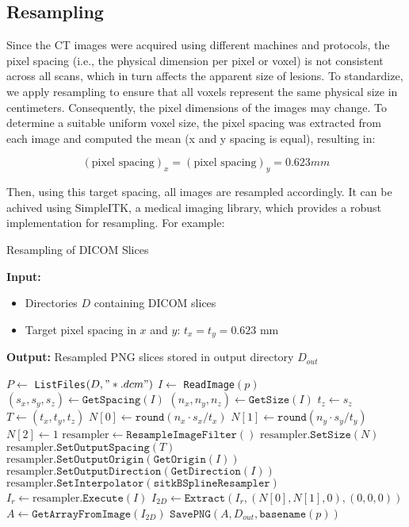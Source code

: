 \subsection*{Resampling}
Since the CT images were acquired using different machines and protocols, the pixel spacing (i.e., the physical dimension per pixel or voxel) is not consistent across all scans, which in turn affects the apparent size of lesions. To standardize, we apply resampling to ensure that all voxels represent the same physical size in centimeters. Consequently, the pixel dimensions of the images may change.
To determine a suitable uniform voxel size, the pixel spacing  was extracted from each image and computed the mean (x and y spacing is equal), resulting in: 

\begin{equation*}
    (\text{pixel spacing})_x = (\text{pixel spacing})_y = 0.623 mm
\end{equation*}

Then, using this target spacing, all images are resampled accordingly.
It can be achived using SimpleITK, a medical imaging library, which provides a robust implementation for resampling. For example:

\begin{algorithm}[H]
    \caption{Resampling of DICOM Slices}
    \begin{algorithmic}[1]
    \State \textbf{Input:} 
    \begin{itemize}
        \item Directories $D$ containing DICOM slices
        \item Target pixel spacing in $x$ and $y$: $t_x = t_y = 0.623$ mm
    \end{itemize}
    \State \textbf{Output:} Resampled PNG slices stored in output directory $D_{out}$
    
    \State $P \gets$ \texttt{ListFiles}$(D, "*.dcm")$
        \State $I \gets$ \texttt{ReadImage}$(p)$
        \State $(s_x, s_y, s_z) \gets \texttt{GetSpacing}(I)$
        \State $(n_x, n_y, n_z) \gets \texttt{GetSize}(I)$
        \State $t_z \gets s_z$
        \State $T \gets (t_x, t_y, t_z)$
        \State $N[0] \gets \texttt{round}(n_x \cdot s_x / t_x)$
        \State $N[1] \gets \texttt{round}(n_y \cdot s_y / t_y)$
        \State $N[2] \gets 1$
        \State $\text{resampler} \gets \texttt{ResampleImageFilter}()$
        \State $\text{resampler}.\texttt{SetSize}(N)$
        \State $\text{resampler}.\texttt{SetOutputSpacing}(T)$
        \State $\text{resampler}.\texttt{SetOutputOrigin}(\texttt{GetOrigin}(I))$
        \State $\text{resampler}.\texttt{SetOutputDirection}(\texttt{GetDirection}(I))$
        \State $\text{resampler}.\texttt{SetInterpolator}(\texttt{sitkBSplineResampler})$
        \State $I_r \gets \text{resampler}.\texttt{Execute}(I)$
        \State $I_{2D} \gets \texttt{Extract}(I_r, (N[0], N[1], 0), (0,0,0))$
        \State $A \gets \texttt{GetArrayFromImage}(I_{2D})$
        \State $\texttt{SavePNG}(A, D_{out}, \texttt{basename}(p))$
    \EndFor
    \end{algorithmic}
    \end{algorithm}
    
